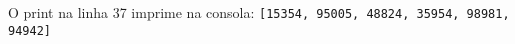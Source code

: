 \documentclass[12pt,varwidth=16cm,border=1pt]{standalone}
\begin{document}
O print na linha 37 imprime na consola:
\newline
\verb+[15354, 95005, 48824, 35954, 98981, 94942]+
\end{document}
